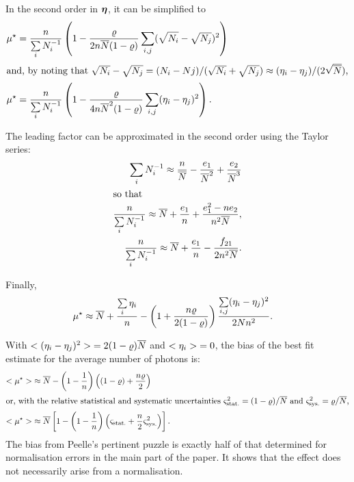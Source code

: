 \documentclass{pasa}
\begin{document}
In the second order in $\boldsymbol{\eta}$, it can be simplified to
\begin{align*}
   \mu^\star &= \frac n{\sum\limits_i N_i^{-1}}
                    \left( 1 
            - \frac{\varrho}{2n\overline{N}(1-\varrho)} 
                \sum_{i,j} (\sqrt{N_i}-\sqrt{N_j})^2 \right)
\\
\intertext{and, by noting that $\sqrt{N_i} - \sqrt{N_j} = (N_i - Nj) / (\sqrt{N_i} + \sqrt{N_j}) \approx (\eta_i - \eta_j) / (2\sqrt{\overline{N}})$,}
   \mu^\star &= \frac n{\sum\limits_i N_i^{-1}} \left(
                1 - \frac{\varrho}{4n\overline{N}^2(1-\varrho)} 
                \sum_{i,j} (\eta_i - \eta_j)^2 
            \right).
\end{align*}

The leading factor can be approximated in the second order using the Taylor series:
\begin{align*}
    \sum_i N_i^{-1} \approx \frac{n}{\overline{N}}
                           - \frac{e_1}{\overline{N}^2} 
                           + \frac{e_2}{\overline{N}^3}\\
\intertext{so that}
    \frac{n}{\sum\limits_i N_i^{-1}} \approx
            \overline{N} + \frac{e_1}{n} + \frac{e_1^2-ne_2}{n^2\overline{N}},\\
    \frac{n}{\sum\limits_i N_i^{-1}} \approx
            \overline{N} + \frac{e_1}{n} - \frac{f_{21}}{2n^2\overline{N}}.
\end{align*}

Finally,
\begin{align*}
    \mu^\star &\approx \overline{N}  + \frac{\sum\limits_i \eta_i}{n}
            - \left(1 + \frac{n\varrho}{2(1-\varrho)} \right)
                    \frac{\sum\limits_{i,j} (\eta_i - \eta_j) ^2}{2Nn^2}.
\end{align*}

With $ {<(\eta_i-\eta_j)^2>}  = 2(1-\varrho)\overline{N}$ and $ {<\eta_i>}  = 0$, the bias of the best fit estimate for the average number of photons is:
\begin{align*}
     {<\ensuremath{\mu}^\star>}  &\approx \overline{N} - \left(1 - \frac 1n\right) \left( 
                    (1-\varrho) + \frac{n\varrho}{2}\right)\\
\intertext{or, with the relative statistical and systematic uncertainties $\varsigma_\text{stat.}^2 = (1-\varrho)/\overline{N}$ and $\varsigma_\text{sys.}^2 = \varrho/\overline{N}$,}
     {<\ensuremath{\mu}^\star>}  &\approx \overline{N} \left[ 1 - \left(1 - \frac 1n\right)
                \left(\varsigma_\text{stat.} + \frac n2 \varsigma_\text{sys.}^2\right)\right].
\end{align*}
The bias from Peelle's pertinent puzzle is exactly half of that determined for normalisation errors in the main part of the paper.  It shows that the effect does not necessarily arise from a normalisation.




\end{document}
